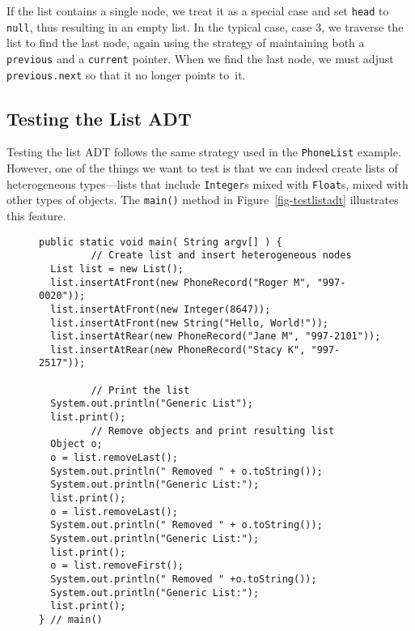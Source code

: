 If the list contains a single node, we treat it as a special case and
set {\tt head} to {\tt null}, thus resulting in an empty list.  In the
typical case, case 3, we traverse the list to find the last node,
again using the strategy of maintaining both a {\tt previous} and a
{\tt current} pointer.  When we find the last node, we must adjust
{\tt previous.next} so that it no longer points to~it.

\subsection*{Testing the List ADT}

\noindent Testing the list ADT follows the same strategy used in the
{\tt PhoneList} example.  However, one of the things we want to test is that
we can indeed create lists of heterogeneous types---lists that include
{\tt Integer}s mixed with {\tt Float}s, mixed with other types of
objects.  The {\tt main()} method in Figure~\ref{fig-testlistadt}
illustrates this feature.

\begin{figure}[bth]
\jjjprogstart
\begin{jjjlisting}[27pc]
\begin{lstlisting}
public static void main( String argv[] ) {
         // Create list and insert heterogeneous nodes
  List list = new List();
  list.insertAtFront(new PhoneRecord("Roger M", "997-0020"));
  list.insertAtFront(new Integer(8647));
  list.insertAtFront(new String("Hello, World!"));
  list.insertAtRear(new PhoneRecord("Jane M", "997-2101"));
  list.insertAtRear(new PhoneRecord("Stacy K", "997-2517"));

         // Print the list
  System.out.println("Generic List");
  list.print();
         // Remove objects and print resulting list
  Object o;
  o = list.removeLast();
  System.out.println(" Removed " + o.toString());
  System.out.println("Generic List:");
  list.print();
  o = list.removeLast();
  System.out.println(" Removed " + o.toString());
  System.out.println("Generic List:");
  list.print();
  o = list.removeFirst();
  System.out.println(" Removed " +o.toString());
  System.out.println("Generic List:");
  list.print();
} // main()
\end{lstlisting}
\end{jjjlisting}
\end{figure}


